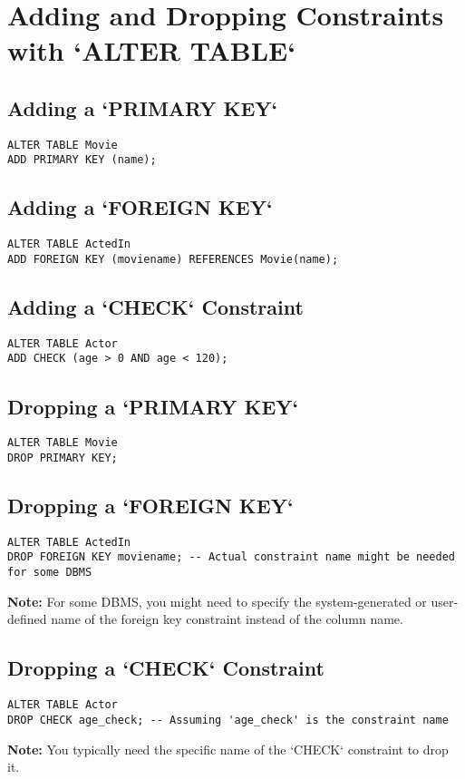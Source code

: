 \documentclass{article}
\begin{document}
\section*{Adding and Dropping Constraints with `ALTER TABLE`}

\subsection*{Adding a `PRIMARY KEY`} 
\begin{lstlisting}
ALTER TABLE Movie
ADD PRIMARY KEY (name);
\end{lstlisting}

\subsection*{Adding a `FOREIGN KEY`}
\begin{lstlisting}
ALTER TABLE ActedIn
ADD FOREIGN KEY (moviename) REFERENCES Movie(name);
\end{lstlisting}

\subsection*{Adding a `CHECK` Constraint}
\begin{lstlisting}
ALTER TABLE Actor
ADD CHECK (age > 0 AND age < 120);
\end{lstlisting}

\subsection*{Dropping a `PRIMARY KEY`}
\begin{lstlisting}
ALTER TABLE Movie
DROP PRIMARY KEY;
\end{lstlisting}

\subsection*{Dropping a `FOREIGN KEY`}
\begin{lstlisting}
ALTER TABLE ActedIn
DROP FOREIGN KEY moviename; -- Actual constraint name might be needed for some DBMS
\end{lstlisting}
\textbf{Note:} For some DBMS, you might need to specify the system-generated or user-defined name of the foreign key constraint instead of the column name.

\subsection*{Dropping a `CHECK` Constraint}
\begin{lstlisting}
ALTER TABLE Actor
DROP CHECK age_check; -- Assuming 'age_check' is the constraint name
\end{lstlisting}
\textbf{Note:} You typically need the specific name of the `CHECK` constraint to drop it.
\end{document}
